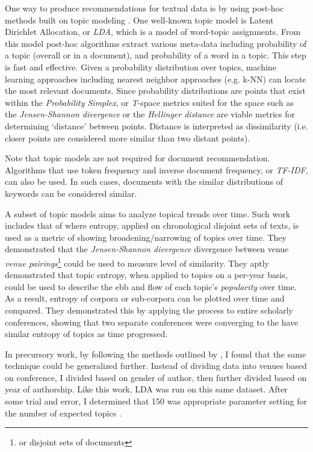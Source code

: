 One way to produce recommendations for textual data is by using post-hoc methods built on topic modeling \citep{blei2012probabilistic}. One well-known topic model is Latent Dirichlet Allocation, or \emph{LDA}, which is a model of word-topic assignments. From this model post-hoc algorithms extract various meta-data including probability of a topic (overall or in a document), and probability of a word in a topic. This step is fast and effective. Given a probability distribution over topics, machine learning approaches including nearest neighbor approaches (e.g. k-NN) can locate the most relevant documents. Since probability distributions are points that exist within the \emph{Probability Simplex}, or \textit{T}-space \citep{Krstovski2013efficient} metrics suited for the space such as the \emph{Jensen-Shannon divergence} or the \emph{Hellinger distance} are viable metrics for determining `distance' between points. Distance is interpreted as dissimilarity (i.e. closer points are considered more similar than two distant points).

Note that topic models are not required for document recommendation. Algorithms that use token frequency and inverse document frequency, or \emph{TF-IDF}, can also be used. In such cases, documents with the similar distributions of keywords can be considered similar.

A subset of topic models aims to analyze topical trends over time. Such work includes that of \cite{hall-jurafsky-manning:2008:EMNLP} where entropy, applied on chronological disjoint sets of texts, is used as a metric of showing broadening/narrowing of topics over time. They demonstrated that the \emph{Jensen-Shannon divergence} divergence between venue \emph{venue pairings}\footnote{or disjoint sets of documents} could be used to measure level of similarity. They aptly demonstrated that topic entropy, when applied to topics on a per-year basis, could be used to describe the ebb and flow of each topic’s \emph{popularity} over time. As a result, entropy of corpora or sub-corpora can be plotted over time and compared. They demonstrated this by applying the process to entire scholarly conferences, showing that two separate conferences were converging to the have similar entropy of topics as time progressed.

In precursory work, by following the methods outlined by \cite{hall-jurafsky-manning:2008:EMNLP}, I found that the same technique could be generalized further. Instead of dividing data into venues based on conference, I divided based on gender of author, then further divided based on year of authorship. Like this work, LDA was run on this same dataset. After some trial and error, I determined that 150 was appropriate parameter setting for the number of expected topics \citep{bean5-LDA-ToT}.

